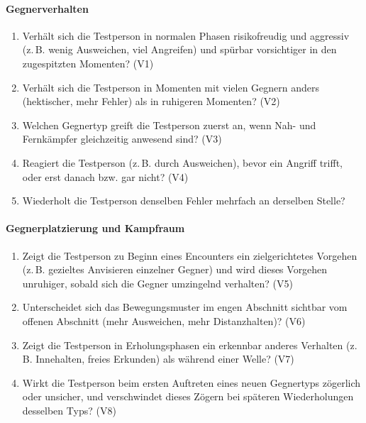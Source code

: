 \documentclass[../Main.tex]{subfiles}
\begin{document}
\begin{enumerate}[label=\textbf{Q\arabic*}, leftmargin=1.5cm, itemsep=0.5em]
\paragraph{Gegnerverhalten}
\begin{enumerate}[label=\textbf{B\arabic*}, leftmargin=1.5cm, itemsep=0.5em]
    \item Verhält sich die Testperson in normalen Phasen risikofreudig und aggressiv (z.\,B. wenig Ausweichen, viel Angreifen) und spürbar vorsichtiger in den zugespitzten Momenten? \hfill (V1)
    \item Verhält sich die Testperson in Momenten mit vielen Gegnern anders (hektischer, mehr Fehler) als in ruhigeren Momenten? \hfill (V2)
    \item Welchen Gegnertyp greift die Testperson zuerst an, wenn Nah- und Fernkämpfer gleichzeitig anwesend sind? \hfill (V3)
    \item Reagiert die Testperson (z.\,B. durch Ausweichen), bevor ein Angriff trifft, oder erst danach bzw. gar nicht? \hfill (V4)
    \item Wiederholt die Testperson denselben Fehler mehrfach an derselben Stelle?
\end{enumerate}
 
\paragraph{Gegnerplatzierung und Kampfraum}
\begin{enumerate}[label=\textbf{B\arabic*}, leftmargin=1.5cm, itemsep=0.5em, resume]
    \item Zeigt die Testperson zu Beginn eines Encounters ein zielgerichtetes Vorgehen (z.\,B. gezieltes Anvisieren einzelner Gegner) und wird dieses Vorgehen unruhiger, sobald sich die Gegner umzingelnd verhalten? \hfill (V5)
    \item Unterscheidet sich das Bewegungsmuster im engen Abschnitt sichtbar vom offenen Abschnitt (mehr Ausweichen, mehr Distanzhalten)? \hfill (V6)
    \item Zeigt die Testperson in Erholungsphasen ein erkennbar anderes Verhalten (z.\,B. Innehalten, freies Erkunden) als während einer Welle? \hfill (V7)
    \item Wirkt die Testperson beim ersten Auftreten eines neuen Gegnertyps zögerlich oder unsicher, und verschwindet dieses Zögern bei späteren Wiederholungen desselben Typs? \hfill (V8)
\end{enumerate}
 

\end{enumerate}
\end{document}
